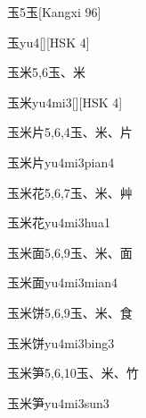\begin{entry}{玉}{5}{⽟}[Kangxi 96]
  \begin{phonetics}{玉}{yu4}[][HSK 4]
  \end{phonetics}
\end{entry}

\begin{entry}{玉米}{5,6}{⽟、⽶}
  \begin{phonetics}{玉米}{yu4mi3}[][HSK 4]
  \end{phonetics}
\end{entry}

\begin{entry}{玉米片}{5,6,4}{⽟、⽶、⽚}
  \begin{phonetics}{玉米片}{yu4mi3pian4}
  \end{phonetics}
\end{entry}

\begin{entry}{玉米花}{5,6,7}{⽟、⽶、⾋}
  \begin{phonetics}{玉米花}{yu4mi3hua1}
  \end{phonetics}
\end{entry}

\begin{entry}{玉米面}{5,6,9}{⽟、⽶、⾯}
  \begin{phonetics}{玉米面}{yu4mi3mian4}
  \end{phonetics}
\end{entry}

\begin{entry}{玉米饼}{5,6,9}{⽟、⽶、⾷}
  \begin{phonetics}{玉米饼}{yu4mi3bing3}
  \end{phonetics}
\end{entry}

\begin{entry}{玉米笋}{5,6,10}{⽟、⽶、⽵}
  \begin{phonetics}{玉米笋}{yu4mi3sun3}
  \end{phonetics}
\end{entry}

